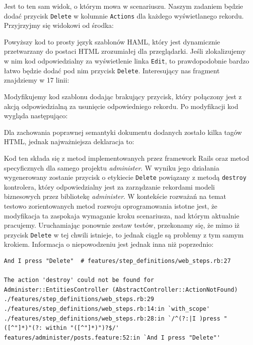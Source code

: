   Jest to ten sam widok, o którym mowa w scenariuszu. Naszym zadaniem będzie dodać przycisk \verb+Delete+ w kolumnie \verb+Actions+ dla każdego wyświetlanego rekordu. Przyjrzyjmy się widokowi od środka:
  
  
  
  Powyższy kod to prosty język szablonów HAML, który jest dynamicznie przetwarzany do postaci HTML zrozumiałej dla przeglądarki. Jeśli zlokalizujemy w nim kod odpowiedzialny za wyświetlenie linka \texttt{Edit}, to prawdopodobnie bardzo łatwo będzie dodać pod nim przycisk \texttt{Delete}. Interesujący nas fragment znajdziemy w 17 linii:
  
  
  
  Modyfikujemy kod szablonu dodając brakujący przycisk, który połączony jest z akcją odpowiedzialną za usunięcie odpowiedniego rekordu. Po modyfikacji kod wygląda następująco:
  
  
  
  Dla zachowania poprawnej semantyki dokumentu dodanych zostało kilka tagów HTML, jednak najważniejsza deklaracja to:
  
  
  
  Kod ten składa się z metod implementowanych przez framework Rails oraz metod specyficznych dla samego projektu \emph{administer}. W wyniku jego działania wygenerowany zostanie przycisk o etykiecie \texttt{Delete} powiązany z metodą \texttt{destroy} kontrolera, który odpowiedzialny jest za zarządzanie rekordami modeli biznesowych przez bibliotekę \emph{administer}. W kontekście rozważań na temat testowo zorientowanych metod rozwoju oprogramowania istotne jest, że modyfikacja ta zaspokaja wymaganie kroku scenariusza, nad którym aktualnie pracujemy. Uruchamiając ponownie zestaw testów, przekonamy się, że mimo iż przycisk \texttt{Delete} w tej chwili istnieje, to jednak ciągle są problemy z tym samym krokiem. Informacja o niepowodzeniu jest jednak inna niż poprzednio:
  
\begin{lstlisting}
And I press "Delete"  # features/step_definitions/web_steps.rb:27

The action 'destroy' could not be found for Administer::EntitiesController (AbstractController::ActionNotFound)
./features/step_definitions/web_steps.rb:29
./features/step_definitions/web_steps.rb:14:in `with_scope'
./features/step_definitions/web_steps.rb:28:in `/^(?:|I )press "([^"]*)"(?: within "([^"]*)")?$/'
features/administer/posts.feature:52:in `And I press "Delete"'
\end{lstlisting}
  
